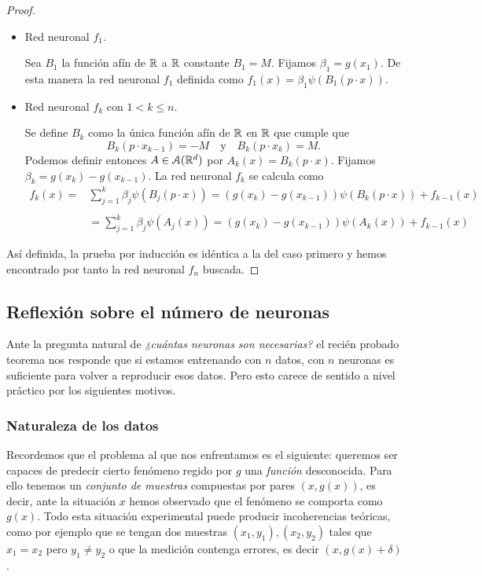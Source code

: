 \begin{proof}
 \begin{itemize}
 \item Red neuronal $f_1$. 

Sea $B_1$ 
la función afín de $\mathbb{R}$ a $\mathbb{R}$ constante $B_1 = M.$
Fijamos $\beta_1 = g(x_1)$. 
De esta manera la red neuronal $f_1$ 
definida como $f_1(x) = \beta_1 \psi(B_1(p \cdot x)).$

\item Red neuronal $f_k$ con $1 < k \leq n$. 

Se define $B_{k}$ como la única función afín de $\mathbb{R}$ en $\mathbb{R}$ que cumple que 
\begin{equation}
    B_k(p \cdot x_{k-1}) = -M 
    \quad \text{y} \quad 
     B_{k}(p \cdot x_k)= M.
\end{equation}
Podemos definir entonces $A \in \mathcal{A}(\mathbb{R}^d)$ por 
$A_k(x)=B_k(p \cdot x).$
Fijamos $\beta_k = g(x_k) - g(x_{k-1})$. 
La red neuronal $f_k$ se calcula como 
\begin{align}
    f_k(x) 
    = &
    \sum_{j=1}^k \beta_j \psi(B_j(p \cdot x))
     = 
    (g(x_k)-g(x_{k-1})) \psi(B_k(p \cdot x)) + f_{k-1}(x) \\
    \\
    & = 
    \sum_{j=1}^k \beta_j \psi(A_j(x))
    = 
   (g(x_k)-g(x_{k-1})) \psi(A_k(x)) + f_{k-1}(x)  
\end{align}
\end{itemize}

Así definida, la prueba por inducción es idéntica a la del caso primero y hemos encontrado por tanto la red neuronal $f_n$ buscada.
\end{proof}

\subsection{Reflexión sobre el número de neuronas} \label{subsection:reflexión_sobre_número_de_neuronas}

Ante la pregunta natural de 
\textit{¿cuántas neuronas son necesarias?} el 
recién probado teorema nos responde que 
si estamos entrenando con $n$ datos, con $n$ neuronas es suficiente para volver a reproducir esos datos. Pero esto carece de sentido a nivel práctico por los siguientes motivos. 

\subsubsection*{Naturaleza de los datos}  
Recordemos que el problema al que nos enfrentamos es el siguiente:
queremos ser capaces de predecir cierto fenómeno regido por $g$ una \textit{función} desconocida. 
Para ello tenemos un \textit{conjunto de muestras} 
compuestas por pares $(x, g(x))$, es decir, ante la situación $x$
hemos observado que el fenómeno se comporta como $g(x)$. Todo esta 
situación experimental puede producir incoherencias teóricas, como por ejemplo que se tengan dos muestras $(x_1, y_1), (x_2, y_2)$ 
tales que $x_1 = x_2$ pero $y_1 \neq y_2$ o que la medición contenga errores, es decir $(x, g(x)+\delta)$. 

